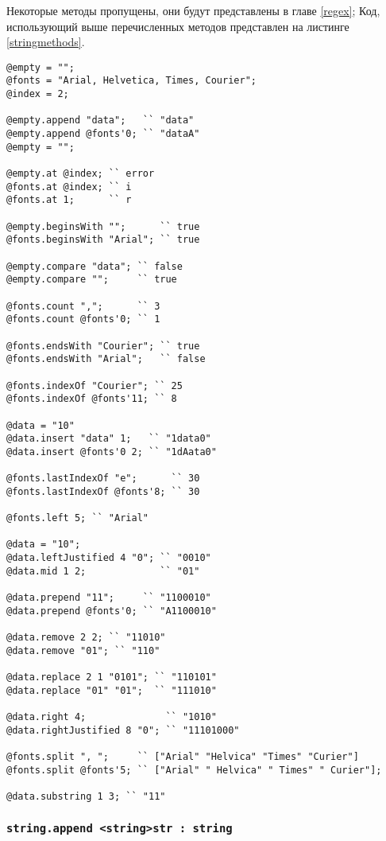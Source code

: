 \documentclass[a4paper, 14pt]{extarticle}
\begin{document}
Некоторые методы пропущены, они будут представлены в главе \ref{regex}; Код, использующий выше перечисленных методов представлен на листинге \ref{stringmethods}.

\begin{lstlisting}[caption=Методы класса string, label=stringmethods]
@empty = "";
@fonts = "Arial, Helvetica, Times, Courier";
@index = 2;

@empty.append "data";   `` "data"
@empty.append @fonts'0; `` "dataA"
@empty = "";

@empty.at @index; `` error
@fonts.at @index; `` i
@fonts.at 1;	  `` r

@empty.beginsWith "";      `` true
@fonts.beginsWith "Arial"; `` true

@empty.compare "data"; `` false
@empty.compare "";     `` true

@fonts.count ",";      `` 3
@fonts.count @fonts'0; `` 1

@fonts.endsWith "Courier"; `` true
@fonts.endsWith "Arial";   `` false

@fonts.indexOf "Courier"; `` 25
@fonts.indexOf @fonts'11; `` 8

@data = "10"
@data.insert "data" 1;   `` "1data0"
@data.insert @fonts'0 2; `` "1dAata0"

@fonts.lastIndexOf "e";      `` 30
@fonts.lastIndexOf @fonts'8; `` 30

@fonts.left 5; `` "Arial"

@data = "10";
@data.leftJustified 4 "0"; `` "0010"
@data.mid 1 2;             `` "01"

@data.prepend "11";     `` "1100010"
@data.prepend @fonts'0; `` "A1100010"

@data.remove 2 2; `` "11010"
@data.remove "01"; `` "110"

@data.replace 2 1 "0101"; `` "110101"
@data.replace "01" "01";  `` "111010"

@data.right 4; 				`` "1010"
@data.rightJustified 8 "0"; `` "11101000"

@fonts.split ", ";     `` ["Arial" "Helvica" "Times" "Curier"]
@fonts.split @fonts'5; `` ["Arial" " Helvica" " Times" " Curier"];

@data.substring 1 3; `` "11"
\end{lstlisting}

\subsubsection{\lstinline|string.append <string>str : string|}
\end{document}
